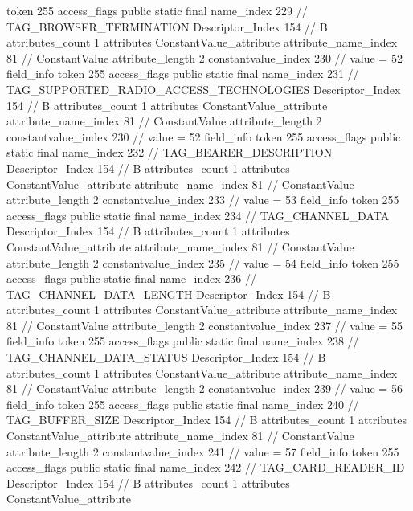 {{{{{				token	255
				access_flags	public static final
				name_index	229		// TAG_BROWSER_TERMINATION
				Descriptor_Index	154		// B
				attributes_count	1
				attributes {
				ConstantValue_attribute {
					attribute_name_index	81		// ConstantValue
					attribute_length	2
					constantvalue_index	230		// value = 52
				}
				}
			}
			field_info {
				token	255
				access_flags	public static final
				name_index	231		// TAG_SUPPORTED_RADIO_ACCESS_TECHNOLOGIES
				Descriptor_Index	154		// B
				attributes_count	1
				attributes {
				ConstantValue_attribute {
					attribute_name_index	81		// ConstantValue
					attribute_length	2
					constantvalue_index	230		// value = 52
				}
				}
			}
			field_info {
				token	255
				access_flags	public static final
				name_index	232		// TAG_BEARER_DESCRIPTION
				Descriptor_Index	154		// B
				attributes_count	1
				attributes {
				ConstantValue_attribute {
					attribute_name_index	81		// ConstantValue
					attribute_length	2
					constantvalue_index	233		// value = 53
				}
				}
			}
			field_info {
				token	255
				access_flags	public static final
				name_index	234		// TAG_CHANNEL_DATA
				Descriptor_Index	154		// B
				attributes_count	1
				attributes {
				ConstantValue_attribute {
					attribute_name_index	81		// ConstantValue
					attribute_length	2
					constantvalue_index	235		// value = 54
				}
				}
			}
			field_info {
				token	255
				access_flags	public static final
				name_index	236		// TAG_CHANNEL_DATA_LENGTH
				Descriptor_Index	154		// B
				attributes_count	1
				attributes {
				ConstantValue_attribute {
					attribute_name_index	81		// ConstantValue
					attribute_length	2
					constantvalue_index	237		// value = 55
				}
				}
			}
			field_info {
				token	255
				access_flags	public static final
				name_index	238		// TAG_CHANNEL_DATA_STATUS
				Descriptor_Index	154		// B
				attributes_count	1
				attributes {
				ConstantValue_attribute {
					attribute_name_index	81		// ConstantValue
					attribute_length	2
					constantvalue_index	239		// value = 56
				}
				}
			}
			field_info {
				token	255
				access_flags	public static final
				name_index	240		// TAG_BUFFER_SIZE
				Descriptor_Index	154		// B
				attributes_count	1
				attributes {
				ConstantValue_attribute {
					attribute_name_index	81		// ConstantValue
					attribute_length	2
					constantvalue_index	241		// value = 57
				}
				}
			}
			field_info {
				token	255
				access_flags	public static final
				name_index	242		// TAG_CARD_READER_ID
				Descriptor_Index	154		// B
				attributes_count	1
				attributes {
				ConstantValue_attribute {
}}}}}}}
